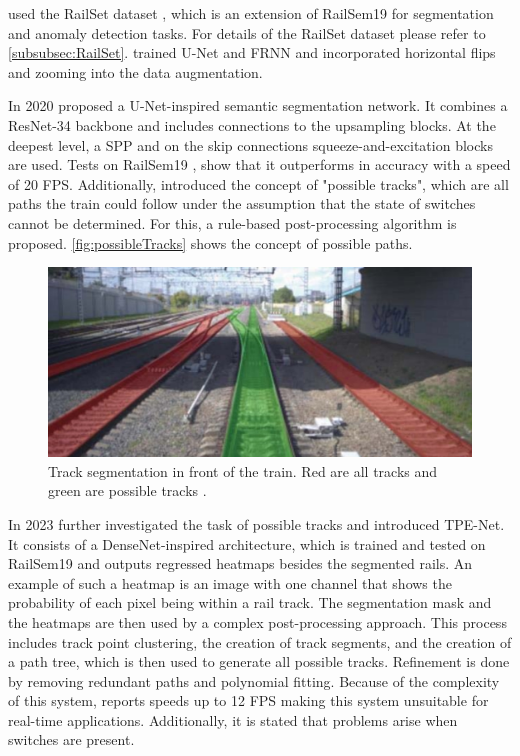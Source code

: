 \cite{hadded2022application} used the RailSet dataset \cite{railSet2022}, which is an extension of RailSem19 for segmentation and anomaly detection tasks.
For details of the RailSet dataset please refer to \autoref{subsubsec:RailSet}.
\cite{hadded2022application} trained U-Net \cite{uNet2015} and FRNN \cite{FRRNBModel2017} and incorporated horizontal flips and zooming into the data augmentation.

In 2020 \cite{RailraodSemanticPossibleTracks2020} proposed a U-Net-inspired \cite{uNet2015} semantic segmentation network.
It combines a ResNet-34 backbone \cite{ResNet} and includes connections to the upsampling blocks.
At the deepest level, a \ac{SPP} \cite{spatialPyramidPooling2014} and on the skip connections squeeze-and-excitation blocks \cite{SqueezeAndExcitation2019} are used.
Tests on RailSem19 \cite{railsem19dataset}, show that it outperforms \cite{railNet2019} in accuracy with a speed of 20 \ac{FPS}.
Additionally, \cite{RailraodSemanticPossibleTracks2020} introduced the concept of "possible tracks", which are all paths the train could follow under the assumption that the state of switches cannot be determined.
For this, a rule-based post-processing algorithm is proposed. \autoref{fig:possibleTracks} shows the concept of possible paths.

\vspace{1cm}

\begin{figure}[H]
    \centering
    \includegraphics[width=0.5\linewidth]{PICs//semanticSegmentation/possibleTracks.jpg}
    \caption{Track segmentation in front of the train. Red are all tracks and green are possible tracks \cite{RailraodSemanticPossibleTracks2020}.}
    \label{fig:possibleTracks}
\end{figure}

\vspace{1cm}

In 2023 \cite{TPENet2023} further investigated the task of possible tracks and introduced \ac{TPE-Net}.
It consists of a DenseNet-inspired architecture, which is trained and tested on RailSem19 and outputs regressed heatmaps besides the segmented rails.
An example of such a heatmap is an image with one channel that shows the probability of each pixel being within a rail track.
The segmentation mask and the heatmaps are then used by a complex post-processing approach.
This process includes track point clustering, the creation of track segments, and the creation of a path tree, which is then used to generate all possible tracks.
Refinement is done by removing redundant paths and polynomial fitting.
Because of the complexity of this system, \cite{TPENet2023} reports speeds up to 12 \ac{FPS} making this system unsuitable for real-time applications.
Additionally, it is stated that problems arise when switches are present.

